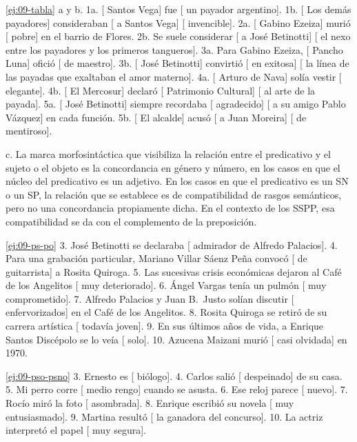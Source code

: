 \begin{solucion}{\ref{ej:09-tabla}}
a y b. 1a. [ Santos Vega] fue [ un payador argentino]. 1b.
[ Los demás payadores] consideraban [ a Santos Vega]
[ invencible]. 2a. [ Gabino Ezeiza] murió [ pobre] en
el barrio de Flores. 2b. Se suele considerar [ a José Betinotti]
[ el nexo entre los payadores y los primeros tangueros]. 3a. Para Gabino
Ezeiza, [ Pancho Luna] ofició [ de maestro]. 3b. [
José Betinotti] convirtió [ en exitosa] [ la línea de las
payadas que exaltaban el amor materno]. 4a. [ Arturo de Nava] solía
vestir [ elegante]. 4b. [ El Mercosur] declaró [
Patrimonio Cultural] [ al arte de la payada]. 5a. [ José
Betinotti] siempre recordaba [ agradecido] [ a su amigo Pablo
Vázquez] en cada función. 5b. [ El alcalde] acusó [ a Juan
Moreira] [ de mentiroso].

c. La marca morfosintáctica que visibiliza la relación entre el predicativo y el
sujeto o el objeto es la concordancia en género y número, en los casos en que el
núcleo del predicativo es un adjetivo. En los casos en que el predicativo es un
SN o un SP, la relación que se establece es de compatibilidad de rasgos
semánticos, pero no una concordancia propiamente dicha. En el contexto de los
SSPP, esa compatibilidad se da con el complemento de la preposición.
\end{solucion}

\begin{solucion}{\ref{ej:09-ps-po}}
3. José Betinotti se declaraba [ admirador de Alfredo Palacios]. 4. Para
una grabación particular, Mariano Villar Sáenz Peña convocó [ de
guitarrista] a Rosita Quiroga. 5. Las sucesivas crisis económicas dejaron al
Café de los Angelitos [ muy deteriorado]. 6. Ángel Vargas tenía un
pulmón [ muy comprometido]. 7. Alfredo Palacios y Juan B.~Justo solían
discutir [ enfervorizados] en el Café de los Angelitos. 8. Rosita Quiroga
se retiró de su carrera artística [ todavía joven]. 9. En sus últimos
años de vida, a Enrique Santos Discépolo se lo veía [
solo]. 10. Azucena Maizani murió [ casi olvidada] en 1970.
\end{solucion}

\begin{solucion}{\ref{ej:09-pso-psno}}
3. Ernesto es [ biólogo]. 4. Carlos salió [ despeinado] de su
casa. 5. Mi perro corre [ medio rengo] cuando se asusta. 6. Ese reloj
parece [ nuevo]. 7. Rocío miró la foto [ asombrada]. 8.
Enrique escribió su novela [ muy entusiasmado]. 9. Martina resultó
[ la ganadora del concurso]. 10. La actriz interpretó el papel
[ muy segura].
\end{solucion}

